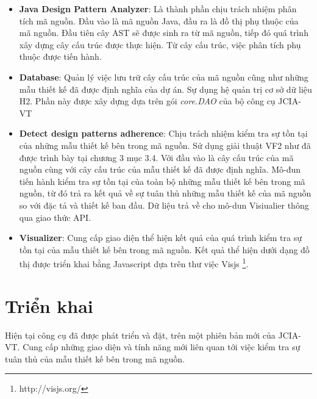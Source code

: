 \documentclass[12pt]{report}
\begin{document}
\begin{itemize}
	\item \noindent \textbf{Java Design Pattern Analyzer}: Là thành phần chịu trách nhiệm phân tích mã nguồn. Đầu vào là mã nguồn Java, đầu ra là đồ thị phụ thuộc của mã nguồn. Đầu tiên cây AST sẽ được sinh ra từ mã nguồn, tiếp đó quá trình xây dựng cây cấu trúc được thực hiện. Từ cây cấu trúc, việc phân tích phụ thuộc được tiến hành.
	\item \noindent \textbf{Database}: Quản lý việc lưu trữ cây cấu trúc của mã nguồn cũng như những mẫu thiết kế đã được định nghĩa của dự án. Sự dụng hệ quản trị cơ sở dữ liệu H2. Phần này được xây dựng dựa trên gói \textit{core.DAO} của bộ công cụ JCIA-VT
	\item \noindent \textbf{Detect design patterns adherence}: Chịu trách nhiệm kiểm tra sự tồn tại của những mẫu thiết kế bên trong mã nguồn. Sử dụng giải thuật VF2 như đã được trình bày tại chương 3 mục 3.4. Với đầu vào là cây cấu trúc của mã nguồn cùng với cây cấu trúc của mẫu thiết kế đã được định nghĩa. Mô-đun tiến hành kiểm tra sự tồn tại của toàn bộ những mẫu thiết kế bên trong mã nguồn, từ đó trả ra kết quả về sự tuân thủ những mẫu thiết kế của mã nguồn so với đặc tả và thiết kế ban đầu. Dữ liệu trả về cho mô-dun Visiualier thông qua giao thức API.
	\item \noindent \textbf{Visualizer}: Cung cấp giao diện thể hiện kết quả của quá trình kiểm tra sự tồn tại của mẫu thiết kế bên trong mã nguồn. Kết quả thể hiện dưới dạng đồ thị được triển khai bằng Javascript dựa trên thư việc Visjs \footnote{http://visjs.org/}.  
\end{itemize}
\section{Triển khai}
Hiện tại công cụ đã được phát triển và đặt, trên một phiên bản mới của JCIA-VT. Cung cấp những giao diện và tính năng mới liên quan tới việc kiểm tra sự tuân thủ của mẫu thiết kế bên trong mã nguồn.
\end{document}
